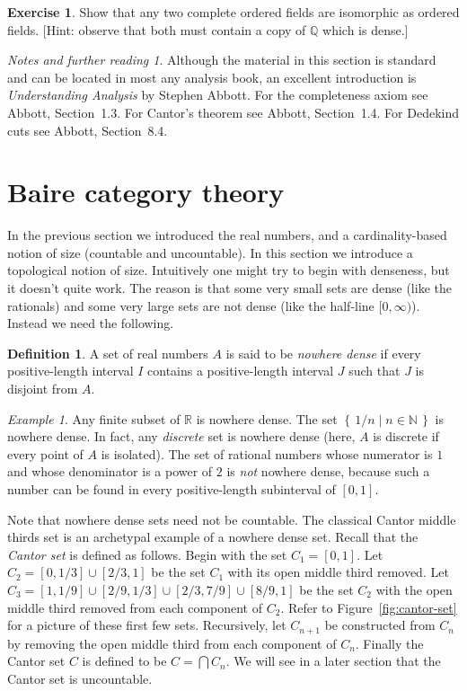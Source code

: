 \documentclass[11pt,oneside]{amsbook}
\newcommand{\set}[1]{\left\{\,#1\,\right\}}
\newcommand{\N}{\mathbb N}
\newcommand{\Q}{\mathbb Q}
\newcommand{\R}{\mathbb R}
\theoremstyle{definition}
\newtheorem{exercise}{Exercise}[section]
\theoremstyle{plain}
\theoremstyle{definition}
\newtheorem{definition}[theorem]{Definition}
\theoremstyle{remark}
\newtheorem{example}[theorem]{Example}
\newtheorem*{notes}{Notes and further reading}
\numberwithin{equation}{section}
\numberwithin{figure}{section}
\begin{document}
\begin{exercise}
  Show that any two complete ordered fields are isomorphic as ordered fields. [Hint: observe that both must contain a copy of $\Q$ which is dense.]
\end{exercise}

\begin{notes}
  Although the material in this section is standard and can be located in most any analysis book, an excellent introduction is \emph{Understanding Analysis} by Stephen Abbott. For the completeness axiom see Abbott, Section~1.3. For Cantor's theorem see Abbott, Section~1.4. For Dedekind cuts see Abbott, Section~8.4.
\end{notes}

\newpage
\section{Baire category theory}

In the previous section we introduced the real numbers, and a cardinality-based notion of size (countable and uncountable). In this section we introduce a topological notion of size. Intuitively one might try to begin with denseness, but it doesn't quite work. The reason is that some very small sets are dense (like the rationals) and some very large sets are not dense (like the half-line $[0,\infty)$). Instead we need the following.

\begin{definition}
  A set of real numbers $A$ is said to be \emph{nowhere dense} if every positive-length interval $I$ contains a positive-length interval $J$ such that $J$ is disjoint from $A$.
\end{definition}

\begin{example}
  Any finite subset of $\R$ is nowhere dense. The set $\set{1/n\mid n\in\N}$ is nowhere dense. In fact, any \emph{discrete} set is nowhere dense (here, $A$ is discrete if every point of $A$ is isolated). The set of rational numbers whose numerator is $1$ and whose denominator is a power of $2$ is \emph{not} nowhere dense, because such a number can be found in every positive-length subinterval of $[0,1]$.
\end{example}

Note that nowhere dense sets need not be countable. The classical Cantor middle thirds set is an archetypal example of a nowhere dense set. Recall that the \emph{Cantor set} is defined as follows. Begin with the set $C_1=[0,1]$. Let $C_2=[0,1/3]\cup[2/3,1]$ be the set $C_1$ with its open middle third removed. Let $C_3=[1,1/9]\cup[2/9,1/3]\cup[2/3,7/9]\cup[8/9,1]$ be the set $C_2$ with the open middle third removed from each component of $C_2$. Refer to Figure~\ref{fig:cantor-set} for a picture of these first few sets. Recursively, let $C_{n+1}$ be constructed from $C_n$ by removing the open middle third from each component of $C_n$. Finally the Cantor set $C$ is defined to be $C=\bigcap C_n$. We will see in a later section that the Cantor set is uncountable. %
\end{document}
